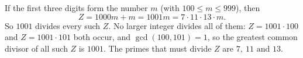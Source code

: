 If the first three digits form the number $m$ (with $100\le m\le999$), then
\[Z=1000m+m=1001m=7\cdot11\cdot13\cdot m.\]
So $1001$ divides every such $Z$. No larger integer divides all of them: $Z=1001\cdot100$ and $Z=1001\cdot101$ both occur, and $\gcd(100,101)=1$, so the greatest common divisor of all such $Z$ is $\boxed{1001}$. The primes that must divide $Z$ are $\boxed{7,\ 11\text{ and }13}$.
